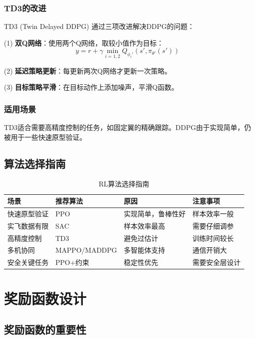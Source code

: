 \subsubsection{TD3的改进}

TD3 (Twin Delayed DDPG) 通过三项改进解决DDPG的问题：

(1) \textbf{双Q网络}：使用两个Q网络，取较小值作为目标：
\begin{equation}
y = r + \gamma \min_{i=1,2} Q_{\phi_i'}(s', \pi_{\theta'}(s'))
\end{equation}

(2) \textbf{延迟策略更新}：每更新两次Q网络才更新一次策略。

(3) \textbf{目标策略平滑}：在目标动作上添加噪声，平滑Q函数。

\subsubsection{适用场景}

TD3适合需要高精度控制的任务，如固定翼的精确跟踪。DDPG由于实现简单，仍被用于一些快速原型验证。

\subsection{算法选择指南}

\begin{table}[htbp]
\centering
\caption{RL算法选择指南}\label{tab:algorithm_guide}
\begin{tabular}{@{}llll@{}}
\toprule
\textbf{场景} & \textbf{推荐算法} & \textbf{原因} & \textbf{注意事项} \\
\midrule
快速原型验证 & PPO & 实现简单，鲁棒性好 & 样本效率一般 \\
实飞数据有限 & SAC & 样本效率最高 & 需要仔细调参 \\
高精度控制 & TD3 & 避免过估计 & 训练时间较长 \\
多机协同 & MAPPO/MADDPG & 多智能体支持 & 通信开销大 \\
安全关键任务 & PPO+约束 & 稳定性优先 & 需要安全层设计 \\
\bottomrule
\end{tabular}
\end{table}

\section{奖励函数设计}\label{sec:reward_design}

\subsection{奖励函数的重要性}

